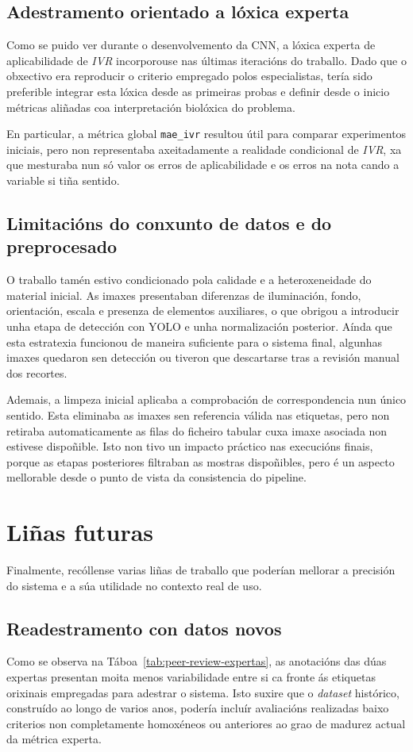 \subsection{Adestramento orientado a lóxica experta}
Como se puido ver durante o desenvolvemento da CNN, a lóxica experta de aplicabilidade de
\textit{IVR} incorporouse nas últimas iteracións do traballo. Dado que o obxectivo era reproducir o
criterio empregado polos especialistas, tería sido preferible integrar esta lóxica desde as primeiras
probas e definir desde o inicio métricas aliñadas coa interpretación biolóxica do problema.

En particular, a métrica global \texttt{mae\_ivr} resultou útil para comparar experimentos iniciais,
pero non representaba axeitadamente a realidade condicional de \textit{IVR}, xa que mesturaba nun só
valor os erros de aplicabilidade e os erros na nota cando a variable si tiña sentido.

\subsection{Limitacións do conxunto de datos e do preprocesado}
O traballo tamén estivo condicionado pola calidade e a heteroxeneidade do material inicial. As imaxes
presentaban diferenzas de iluminación, fondo, orientación, escala e presenza de elementos auxiliares,
o que obrigou a introducir unha etapa de detección con YOLO e unha normalización posterior. Aínda que
esta estratexia funcionou de maneira suficiente para o sistema final, algunhas imaxes quedaron sen
detección ou tiveron que descartarse tras a revisión manual dos recortes.

Ademais, a limpeza inicial aplicaba a comprobación de correspondencia nun único sentido. Esta eliminaba as
imaxes sen referencia válida nas etiquetas, pero non retiraba automaticamente as filas do ficheiro
tabular cuxa imaxe asociada non estivese dispoñible. Isto non tivo un impacto práctico nas execucións
finais, porque as etapas posteriores filtraban as mostras dispoñibles, pero é un aspecto mellorable
desde o punto de vista da consistencia do pipeline.

\section{Liñas futuras}
Finalmente, recóllense varias liñas de traballo que poderían mellorar a precisión do sistema e a súa
utilidade no contexto real de uso.

\subsection{Readestramento con datos novos}
Como se observa na Táboa~\ref{tab:peer-review-expertas}, as anotacións das dúas expertas presentan
moita menos variabilidade entre si ca fronte ás etiquetas orixinais empregadas para adestrar o
sistema. Isto suxire que o \textit{dataset} histórico, construído ao longo de varios anos, podería
incluír avaliacións realizadas baixo criterios non completamente homoxéneos ou anteriores ao grao de
madurez actual da métrica experta.

